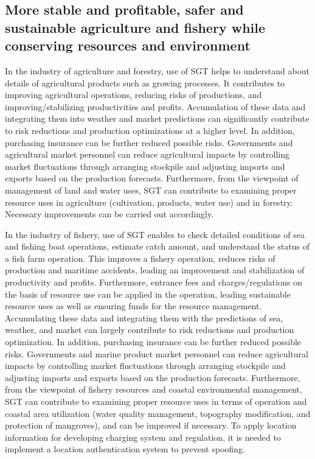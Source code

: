 \subsection{More stable and profitable, safer and sustainable agriculture and fishery while conserving resources and environment}

\tab In the industry of agriculture and forestry, use of SGT helps to understand about details of agricultural products such as growing processes. It contributes to improving agricultural operations, reducing risks of productions, and improving/stabilizing productivities and profits. Accumulation of these data and integrating them into weather and market predictions can significantly contribute to risk reductions and production optimizations at a higher level. In addition, purchasing insurance can be further reduced possible risks. Governments and agricultural market personnel can reduce agricultural impacts by controlling market fluctuations through arranging stockpile and adjusting imports and exports based on the production forecasts. Furthermore, from the viewpoint of management of land and water uses, SGT can contribute to examining proper resource uses in agriculture (cultivation, products, water use) and in forestry. Necessary improvements can be carried out accordingly.

\vspace{0.4 cm}

In the industry of fishery, use of SGT enables to check detailed conditions of sea and fishing boat operations, estimate catch amount, and understand the status of a fish farm operation. This improves a fishery operation, reduces risks of production and maritime accidents, leading an improvement and stabilization of productivity and profits. Furthermore, entrance fees and charges/regulations on the basis of resource use can be applied in the operation, leading sustainable resource uses as well as ensuring funds for the resource management. Accumulating these data and integrating them with the predictions of sea, weather, and market can largely contribute to risk reductions and production optimization. In addition, purchasing insurance can be further reduced possible risks. Governments and marine product market personnel can reduce agricultural impacts by controlling market fluctuations through arranging stockpile and adjusting imports and exports based on the production forecasts. Furthermore, from the viewpoint of fishery resources and coastal environmental management, SGT can contribute to examining proper resource uses in terms of operation and coastal area utilization (water quality management, topography modification, and protection of mangroves), and can be improved if necessary. To apply location information for developing charging system and regulation, it is needed to implement a location authentication system to prevent spoofing.

